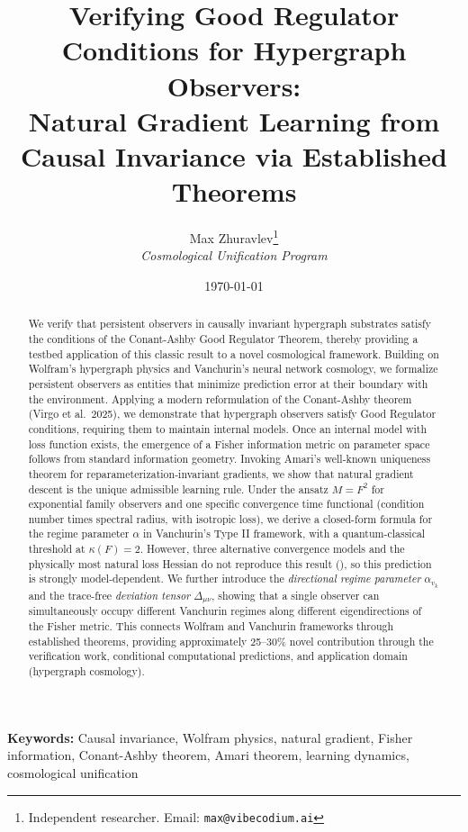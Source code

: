 \documentclass[11pt,a4paper]{article}
\title{\textbf{Verifying Good Regulator Conditions for Hypergraph Observers:} \\[0.3em]
\large Natural Gradient Learning from Causal Invariance via Established Theorems}
\author{
Max Zhuravlev\thanks{Independent researcher. Email: \texttt{max@vibecodium.ai}} \\
\small \textit{Cosmological Unification Program}
}
\date{\today}
\theoremstyle{plain}
\theoremstyle{definition}
\theoremstyle{remark}
\begin{document}
\maketitle


\begin{abstract}
We verify that persistent observers in causally invariant hypergraph substrates satisfy the conditions of the Conant-Ashby Good Regulator Theorem, thereby providing a testbed application of this classic result to a novel cosmological framework. Building on Wolfram's hypergraph physics and Vanchurin's neural network cosmology, we formalize persistent observers as entities that minimize prediction error at their boundary with the environment. Applying a modern reformulation of the Conant-Ashby theorem (Virgo et al.~2025), we demonstrate that hypergraph observers satisfy Good Regulator conditions, requiring them to maintain internal models. Once an internal model with loss function exists, the emergence of a Fisher information metric on parameter space follows from standard information geometry. Invoking Amari's well-known uniqueness theorem for reparameterization-invariant gradients, we show that natural gradient descent is the unique admissible learning rule. Under the ansatz $M = F^2$ for exponential family observers and one specific convergence time functional (condition number times spectral radius, with isotropic loss), we derive a closed-form formula for the regime parameter $\alpha$ in Vanchurin's Type II framework, with a quantum-classical threshold at $\kappa(F) = 2$. However, three alternative convergence models and the physically most natural loss Hessian do not reproduce this result (), so this prediction is strongly model-dependent. We further introduce the \emph{directional regime parameter} $\alpha_{v_k}$ and the trace-free \emph{deviation tensor} $\Delta_{\mu\nu}$, showing that a single observer can simultaneously occupy different Vanchurin regimes along different eigendirections of the Fisher metric. This connects Wolfram and Vanchurin frameworks through established theorems, providing approximately 25--30\% novel contribution through the verification work, conditional computational predictions, and application domain (hypergraph cosmology).
\end{abstract}

\noindent\textbf{Keywords:} Causal invariance, Wolfram physics, natural gradient, Fisher information, Conant-Ashby theorem, Amari theorem, learning dynamics, cosmological unification
\end{document}
